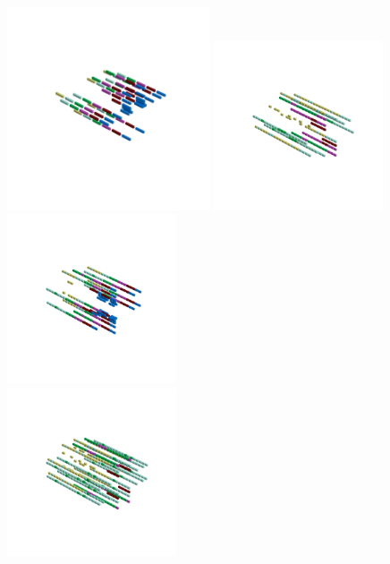 \begin{minipage}[b]{0.48\linewidth}                                       
  \begin{figure}[H]
      \centering
        \vspace*{-1cm}
        \hspace*{-2cm}
        \includegraphics[width=6cm]{src/symmetries/pattern12_1-45.png}%
        \hspace*{-3cm}
        \includegraphics[width=5cm]{src/symmetries/pattern12_2-45.png}\\
        \vspace*{-3cm}
        \hspace*{-4cm}
        \includegraphics[width=5cm]{src/symmetries/pattern12_3-45.png} \\
        \vspace*{-5cm}
        \includegraphics[width=5cm]{src/symmetries/pattern12_4-45.png}
        \vspace*{-1cm}
  \caption*{}
  \end{figure}
\end{minipage}
